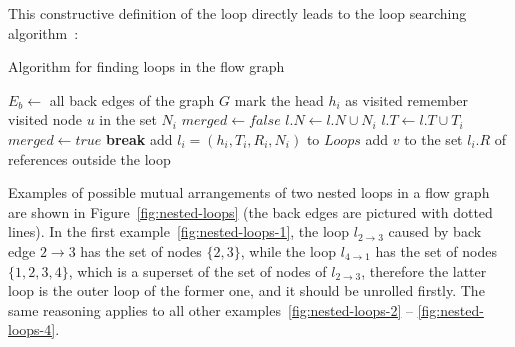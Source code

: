 This constructive definition of the loop directly leads to the loop searching algorithm~\cite{aho2007compilers::loop_unrolling}:

\begin{algorithm}
\caption{Algorithm for finding loops in the flow graph}\label{alg:find-loops}
\begin{algorithmic}[1]
\State $E_b \gets$ all back edges of the graph $G$
  \State mark the head $h_i$ as visited 
    \State remember visited node $u$ in the set $N_i$
    \State $merged \gets false$
        \newline {}
        \State $l.N \gets l.N \cup N_i$ \label{alg:find-loops:merge-loops-1}
        \State $l.T \gets l.T \cup T_i$ \label{alg:find-loops:merge-loops-2}
        \State $merged \gets true$
        \State \textbf{break}
      \EndIf
    \EndFor
        \State add $l_i = (h_i, T_i, R_i, N_i)$ to $Loops$
      \EndIf
  \EndFor
  \newline {}
        \State add $v$ to the set $l_i.R$ of references outside the loop
      \EndIf
    \EndFor
  \EndFor
\EndFor
\EndFunction
\end{algorithmic}
\end{algorithm}

Examples of possible mutual arrangements of two nested loops in a flow graph are shown in Figure~\ref{fig:nested-loops} (the back edges are pictured with dotted lines). In the first example~\ref{fig:nested-loops-1}, the loop $l_{2 \rightarrow 3}$ caused by back edge $2 \rightarrow 3$ has the set of nodes $\{2, 3\}$, while the loop $l_{4 \rightarrow 1}$ has the set of nodes $\{1,2,3,4\}$, which is a superset of the set of nodes of $l_{2 \rightarrow 3}$, therefore the latter loop is the outer loop of the former one, and it should be unrolled firstly. The same reasoning applies to all other examples~\ref{fig:nested-loops-2} -- \ref{fig:nested-loops-4}.

